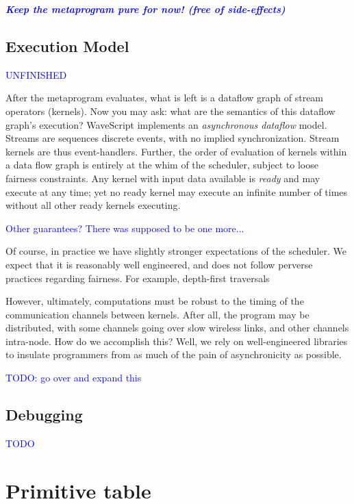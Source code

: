 \documentclass[twocolumn]{report}
\newcommand{\rednote}[1]{{\textcolor{blue}{#1}}}
\begin{document}
\rednote{\em \bf Keep the metaprogram pure for now! (free of side-effects)}

\section{Execution Model}

\rednote{UNFINISHED}

After the metaprogram evaluates, what is left is a dataflow graph of
stream operators (kernels).  Now you may ask: what are the semantics
of this dataflow graph's execution?  WaveScript implements an {\em
asynchronous dataflow} model.  Streams are sequences discrete events,
with no implied synchronization.  Stream kernels are thus
event-handlers.  Further, the order of evaluation of kernels within a
data flow graph is entirely at the whim of the scheduler, subject to
loose fairness constraints.  Any kernel with input data available is
{\em ready} and may execute at any time; yet no ready kernel may
execute an infinite number of times without all other ready kernels
executing.

\rednote{Other guarantees?  There was supposed to be one more...}

Of course, in practice we have slightly stronger expectations of the
scheduler.  We expect that it is reasonably well engineered, and does not
follow perverse practices regarding fairness.  For example,
depth-first traversals

However, ultimately, computations must be robust to the timing of the
communication channels between kernels.  After all, the program may be
distributed, with some channels going over slow wireless links, and
other channels intra-node.  How do we accomplish this?  Well, we rely
on well-engineered libraries to insulate programmers from as much of
the pain of asynchronicity as possible.

\rednote{TODO: go over and expand this}

\section{Debugging}

\rednote{TODO}

\appendix
\chapter{Primitive table}\label{s:primtable}
\end{document}
